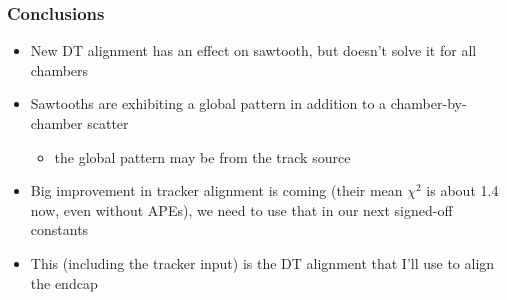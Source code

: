 \documentclass[compress]{beamer}
\begin{document}
\begin{frame}

\end{frame}

\begin{frame}
\frametitle{Conclusions}

\begin{itemize}
\item New DT alignment has an effect on sawtooth, but doesn't solve it for all chambers
\item Sawtooths are exhibiting a global pattern in addition to a chamber-by-chamber scatter
\begin{itemize}
\item the global pattern may be from the track source
\end{itemize}

\item Big improvement in tracker alignment is coming (their mean
  $\chi^2$ is about 1.4 now, even without APEs), we need to use that
  in our next signed-off constants

\item This (including the tracker input) is the DT alignment that I'll
  use to align the endcap

\end{itemize}
\label{numpages}

\end{frame}
\end{document}
